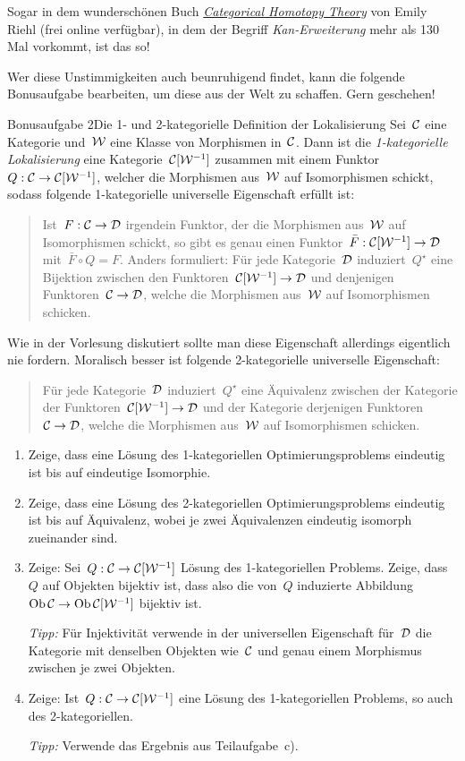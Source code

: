 \documentclass{uebblatt}
\begin{document}
Sogar in dem wunderschönen Buch
\href{http://www.math.harvard.edu/~eriehl/cathtpy.pdf}{\emph{Categorical
Homotopy Theory}} von Emily
Riehl (frei online verfügbar), in dem der Begriff \emph{Kan-Erweiterung} mehr als 130 Mal vorkommt,
ist das so!

Wer diese Unstimmigkeiten auch beunruhigend findet, kann die folgende
Bonusaufgabe bearbeiten, um diese aus der Welt zu schaffen. Gern geschehen!

\begin{aufgabe*}{Bonusaufgabe 2}{Die 1- und 2-kategorielle Definition der Lokalisierung}
Sei~$\mathcal{C}$ eine Kategorie und~$\mathcal{W}$ eine Klasse von Morphismen in~$\mathcal{C}$. Dann ist
die \emph{1-kategorielle Lokalisierung} eine Kategorie~$\mathcal{C}[\mathcal{W}^{-1}]$ zusammen
mit einem Funktor~$Q : \mathcal{C} \to \mathcal{C}[\mathcal{W}^{-1}]$, welcher die Morphismen aus~$\mathcal{W}$ auf
Isomorphismen schickt, sodass folgende 1-kategorielle universelle Eigenschaft
erfüllt ist:
\begin{quote}Ist~$F : \mathcal{C} \to \mathcal{D}$ irgendein Funktor, der die Morphismen aus~$\mathcal{W}$
auf Isomorphismen schickt, so gibt es genau einen Funktor~$\bar F : \mathcal{C}[\mathcal{W}^{-1}]
\to \mathcal{D}$ mit~$\bar F \circ Q = F$. Anders formuliert: Für jede Kategorie~$\mathcal{D}$
induziert~$Q^\star$ eine Bijektion zwischen den Funktoren~$\mathcal{C}[\mathcal{W}^{-1}] \to \mathcal{D}$
und denjenigen Funktoren~$\mathcal{C} \to \mathcal{D}$, welche die Morphismen aus~$\mathcal{W}$ auf
Isomorphismen schicken.
\end{quote}
Wie in der Vorlesung diskutiert sollte man diese Eigenschaft allerdings
eigentlich nie fordern. Moralisch besser ist folgende 2-kategorielle
universelle Eigenschaft:
\begin{quote}
Für jede Kategorie~$\mathcal{D}$ induziert~$Q^\star$ eine Äquivalenz zwischen der
Kategorie der Funktoren~$\mathcal{C}[\mathcal{W}^{-1}] \to \mathcal{D}$ und der Kategorie derjenigen
Funktoren~$\mathcal{C} \to \mathcal{D}$, welche die Morphismen aus~$\mathcal{W}$ auf Isomorphismen
schicken.
\end{quote}
\begin{enumerate}
\item Zeige, dass eine Lösung des 1-kategoriellen Optimierungsproblems
eindeutig ist bis auf eindeutige Isomorphie.
\item Zeige, dass eine Lösung des 2-kategoriellen Optimierungsproblems
eindeutig ist bis auf Äquivalenz, wobei je zwei Äquivalenzen eindeutig isomorph
zueinander sind.
\item Zeige: Sei~$Q : \mathcal{C} \to \mathcal{C}[\mathcal{W}^{-1}]$ Lösung des 1-kategoriellen Problems.
Zeige, dass~$Q$ auf Objekten bijektiv ist, dass also die von~$Q$ induzierte
Abbildung~$\operatorname{Ob} \mathcal{C} \to \operatorname{Ob} \mathcal{C}[\mathcal{W}^{-1}]$ bijektiv ist.

\emph{Tipp:} Für Injektivität verwende in der universellen Eigenschaft für~$\mathcal{D}$
die Kategorie mit denselben Objekten wie~$\mathcal{C}$ und genau einem Morphismus
zwischen je zwei Objekten.
\item Zeige: Ist~$Q : \mathcal{C} \to \mathcal{C}[\mathcal{W}^{-1}]$ eine Lösung des 1-kategoriellen
Problems, so auch des 2-kategoriellen.

\emph{Tipp:} Verwende das Ergebnis aus Teilaufgabe~c).
\end{enumerate}
\end{aufgabe*}
\end{document}
